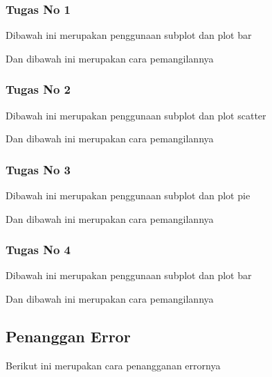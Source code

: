 \subsubsection{Tugas No 1}
\hfill \break
Dibawah ini merupakan penggunaan subplot dan plot bar

Dan dibawah ini merupakan cara pemangilannya



\subsubsection{Tugas No 2}

\hfill \break

Dibawah ini merupakan penggunaan subplot dan plot scatter

Dan dibawah ini merupakan cara pemangilannya



\subsubsection{Tugas No 3}

\hfill \break

Dibawah ini merupakan penggunaan subplot dan plot pie

Dan dibawah ini merupakan cara pemangilannya



\subsubsection{Tugas No 4}

\hfill \break

Dibawah ini merupakan penggunaan subplot dan plot bar

Dan dibawah ini merupakan cara pemangilannya



\subsection{Penanggan Error}

\hfill \break

Berikut ini merupakan cara penangganan errornya
